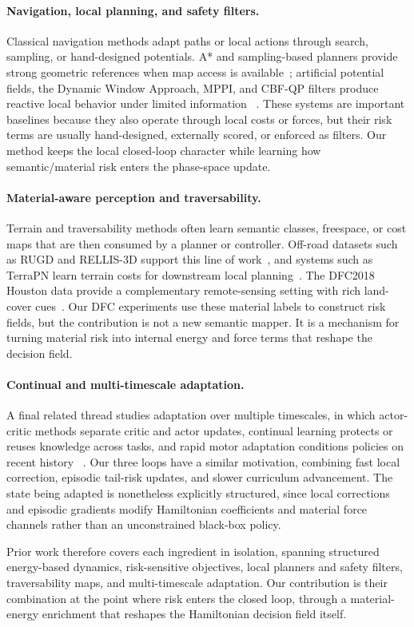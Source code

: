 \paragraph{Navigation, local planning, and safety filters.}
Classical navigation methods adapt paths or local actions through
search, sampling, or hand-designed potentials. A* and sampling-based
planners provide strong geometric references when map access is
available~\citep{hart1968formal,karaman2011sampling}; artificial
potential fields, the Dynamic Window Approach, MPPI, and CBF-QP filters
produce reactive local behavior under limited information
~\citep{khatib1986real,fox1997dynamic,williams2017mppi,ames2016control}.
These systems are important baselines because they also operate through
local costs or forces, but their risk terms are usually hand-designed,
externally scored, or enforced as filters. Our method keeps the local
closed-loop character while learning how semantic/material risk enters
the phase-space update.

\paragraph{Material-aware perception and traversability.}
Terrain and traversability methods often learn semantic classes,
freespace, or cost maps that are then consumed by a planner or
controller. Off-road datasets such as RUGD and RELLIS-3D support this
line of work~\citep{rugd2019,rellis2020}, and systems such as TerraPN
learn terrain costs for downstream local planning~\citep{sathyamoorthy2022terrapn}.
The DFC2018 Houston data provide a complementary remote-sensing setting
with rich land-cover cues~\citep{dfc2018}. Our DFC experiments use these
material labels to construct risk fields, but the contribution is not a
new semantic mapper. It is a mechanism for turning material risk into
internal energy and force terms that reshape the decision field.

\paragraph{Continual and multi-timescale adaptation.}
A final related thread studies adaptation over multiple timescales, in which
actor-critic methods separate critic and actor updates, continual
learning protects or reuses knowledge across tasks, and rapid motor
adaptation conditions policies on recent history
~\citep{kirkpatrick2017ewc,rusu2016progressive,kumar2021rma}.
Our three loops have a similar motivation, combining fast local correction,
episodic tail-risk updates, and slower curriculum advancement. The state being
adapted is nonetheless explicitly structured, since local corrections and
episodic gradients modify Hamiltonian coefficients and material force
channels rather than an unconstrained black-box policy.

Prior work therefore covers each ingredient in isolation, spanning structured
energy-based dynamics, risk-sensitive objectives, local planners and
safety filters, traversability maps, and multi-timescale adaptation. Our
contribution is their combination at the point where risk enters the
closed loop, through a material-energy enrichment that reshapes the Hamiltonian
decision field itself.
